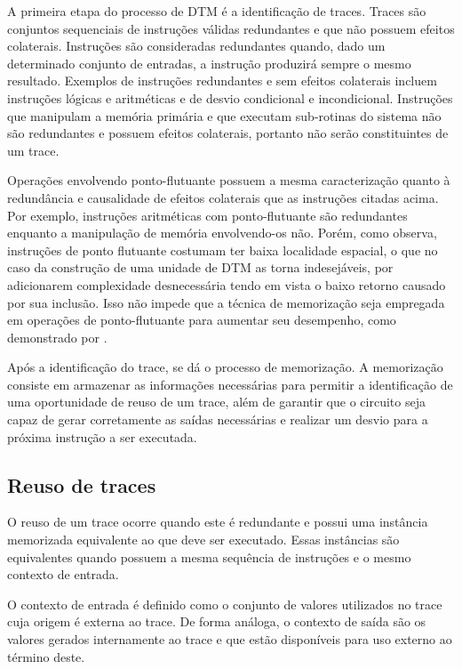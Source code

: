 A primeira etapa do processo de DTM é a identificação de traces. Traces são conjuntos sequenciais de instruções válidas redundantes e que não possuem efeitos colaterais. Instruções são consideradas redundantes quando, dado um determinado conjunto de entradas, a instrução produzirá sempre o mesmo resultado. Exemplos de instruções redundantes e sem efeitos colaterais incluem instruções lógicas e aritméticas e de desvio condicional e incondicional. Instruções que manipulam a memória primária e que executam sub-rotinas do sistema não são redundantes e possuem efeitos colaterais, portanto não serão constituintes de um trace.

Operações envolvendo ponto-flutuante possuem a mesma caracterização quanto à redundância e causalidade de efeitos colaterais que as instruções citadas acima. Por exemplo, instruções aritméticas com ponto-flutuante são redundantes enquanto a manipulação de memória envolvendo-os não. Porém, como  observa, instruções de ponto flutuante costumam ter baixa localidade espacial, o que no caso da construção de uma unidade de DTM as torna indesejáveis, por adicionarem complexidade desnecessária tendo em vista o baixo retorno causado por sua inclusão. Isso não impede que a técnica de memorização seja empregada em operações de ponto-flutuante para aumentar seu desempenho, como demonstrado por .

Após a identificação do trace, se dá o processo de memorização. A memorização consiste em armazenar as informações necessárias para permitir a identificação de uma oportunidade de reuso de um trace, além de garantir que o circuito seja capaz de gerar corretamente as saídas necessárias e realizar um desvio para a próxima instrução a ser executada.



\subsection{Reuso de traces}
\label{Fundamentacao:DTM:Reuso}

O reuso de um trace ocorre quando este é redundante e possui uma instância memorizada equivalente ao que deve ser executado. Essas instâncias são equivalentes quando possuem a mesma sequência de instruções e o mesmo contexto de entrada.

O contexto de entrada é definido como o conjunto de valores utilizados no trace cuja origem é externa ao trace. De forma análoga, o contexto de saída são os valores gerados internamente ao trace e que estão disponíveis para uso externo ao término deste.

